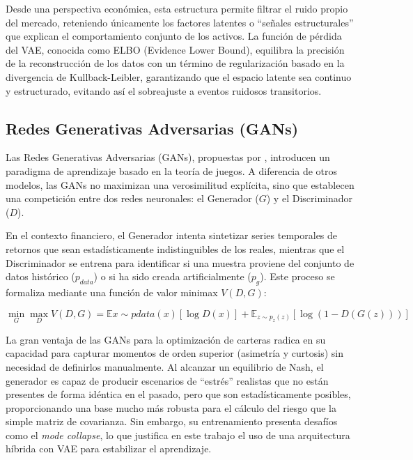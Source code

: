 Desde una perspectiva económica, esta estructura permite filtrar el ruido propio del mercado, reteniendo únicamente los factores latentes o ``señales estructurales'' que explican el comportamiento conjunto de los activos. La función de pérdida del VAE, conocida como ELBO (Evidence Lower Bound), equilibra la precisión de la reconstrucción de los datos con un término de regularización basado en la divergencia de Kullback-Leibler, garantizando que el espacio latente sea continuo y estructurado, evitando así el sobreajuste a eventos ruidosos transitorios.

\subsection{Redes Generativas Adversarias (GANs)}

Las Redes Generativas Adversarias (GANs), propuestas por \cite{NIPS2016_8a3363ab}, introducen un paradigma de aprendizaje basado en la teoría de juegos. A diferencia de otros modelos, las GANs no maximizan una verosimilitud explícita, sino que establecen una competición entre dos redes neuronales: el Generador ($G$) y el Discriminador ($D$).

En el contexto financiero, el Generador intenta sintetizar series temporales de retornos que sean estadísticamente indistinguibles de los reales, mientras que el Discriminador se entrena para identificar si una muestra proviene del conjunto de datos histórico ($p_{data}$) o si ha sido creada artificialmente ($p_g$). Este proceso se formaliza mediante una función de valor minimax $V(D, G)$:

\begin{equation}
    \min_{G} \max_{D} V(D, G) = \mathbb{E}{x \sim p{data}(x)}[\log D(x)] + \mathbb{E}_{z \sim p_z(z)}[\log(1 - D(G(z)))]
\end{equation}

La gran ventaja de las GANs para la optimización de carteras radica en su capacidad para capturar momentos de orden superior (asimetría y curtosis) sin necesidad de definirlos manualmente. Al alcanzar un equilibrio de Nash, el generador es capaz de producir escenarios de ``estrés'' realistas que no están presentes de forma idéntica en el pasado, pero que son estadísticamente posibles, proporcionando una base mucho más robusta para el cálculo del riesgo que la simple matriz de covarianza. Sin embargo, su entrenamiento presenta desafíos como el \textit{mode collapse}, lo que justifica en este trabajo el uso de una arquitectura híbrida con VAE para estabilizar el aprendizaje.

